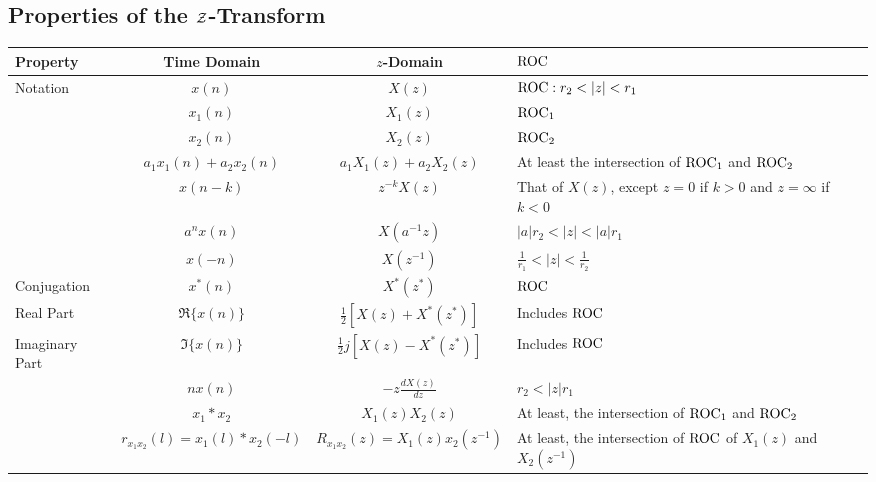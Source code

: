 \subsection{Properties of the \texorpdfstring{$\operatorname{\mathcal{Z}}$-Transform}{Z-Transform}}\label{subsec:Z-Transform Properties}
\begin{table}[h!]
  \centering
  \begin{tabular}{p{4cm}ccp{5cm}}
    \toprule
    Property & Time Domain & $z$-Domain & $\operatorname{\mathrm{ROC}}$ \\
    \midrule
    \multirow{3}{*}{Notation} & $x(n)$ & $X(z)$ & $\operatorname{\mathrm{ROC}}: r_{2} < \lvert z \rvert < r_{1}$ \\
             & $x_{1}(n)$ & $X_{1}(z)$ & $\operatorname{\mathrm{ROC}}_{1}$ \\
             & $x_{2}(n)$ & $X_{2}(z)$ & $\operatorname{\mathrm{ROC}}_{2}$ \\
    \nameref{subsubsec:Z-Transform Linearity} & $a_{1}x_{1}(n) + a_{2}x_{2}(n)$ & $a_{1}X_{1}(z) + a_{2}X_{2}(z)$ & At least the intersection of $\operatorname{\mathrm{ROC}}_{1}$ and $\operatorname{\mathrm{ROC}}_{2}$ \\
    \nameref{subsubsec:Z-Transform Time Shifting} & $x(n-k)$ & $z^{-k}X(z)$ & That of $X(z)$, except $z=0$ if $k>0$ and $z=\infty$ if $k<0$ \\
    \nameref{subsubsec:Z-Domain Scaling} & $a^{n}x(n)$ & $X(a^{-1}z)$ & $\lvert a \rvert r_{2} < \lvert z \rvert < \lvert a \rvert r_{1}$ \\
    \nameref{subsubsec:Z-Transform Time Reversal} & $x(-n)$ & $X(z^{-1})$ & $\frac{1}{r_{1}} < \lvert z \rvert < \frac{1}{r_{2}}$ \\
    Conjugation & $x^{*}(n)$ & $X^{*}(z^{*})$ & $\operatorname{\mathrm{ROC}}$ \\
    Real Part & $\Re \lbrace x(n) \rbrace$ & $\frac{1}{2} \left[ X(z) + X^{*}(z^{*}) \right]$ & Includes $\operatorname{\mathrm{ROC}}$ \\
    Imaginary Part & $\Im \lbrace x(n) \rbrace$ & $\frac{1}{2} j \left[ X(z) - X^{*}(z^{*}) \right]$ & Includes $\operatorname{\mathrm{ROC}}$ \\
    \nameref{subsubsec:Z-Domain Differentiation} & $nx(n)$ & $-z \frac{dX(z)}{dz}$ & $r_{2} < \lvert z \rvert r_{1}$ \\
    \nameref{subsubsec:Z-Domain Convolutions} & $x_{1} * x_{2}$ & $X_{1}(z)X_{2}(z)$ & At least, the intersection of $\operatorname{\mathrm{ROC}}_{1}$ and $\operatorname{\mathrm{ROC}}_{2}$ \\
    \nameref{subsubsec:Z-Transform 2 Sequence Correlation} & $r_{x_{1}x_{2}}(l) = x_{1}(l) * x_{2}(-l)$ & $R_{x_{1}x_{2}}(z) = X_{1}(z)x_{2}(z^{-1})$ & At least, the intersection of $\operatorname{\mathrm{ROC}}$ of $X_{1}(z)$ and $X_{2}(z^{-1})$ \\

\end{tabular}
\end{table}
